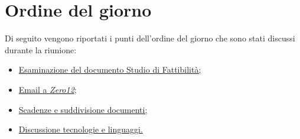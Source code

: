 \clearpage
\section{Ordine del giorno}
Di seguito vengono riportati i punti dell’ordine del giorno che sono stati discussi durante la riunione:
\begin{itemize}
	\item \hyperref[sec:esami_studio_fattibilita]{Esaminazione del documento Studio di Fattibilità;}
	\item \hyperref[sec:mail_zero]{Email a \emph{Zero12};}
	\item \hyperref[sec:scadenza]{Scadenze e suddivisione documenti;}
	\item \hyperref[sec:linguaggi_tec]{Discussione tecnologie e linguaggi.}
\end{itemize}